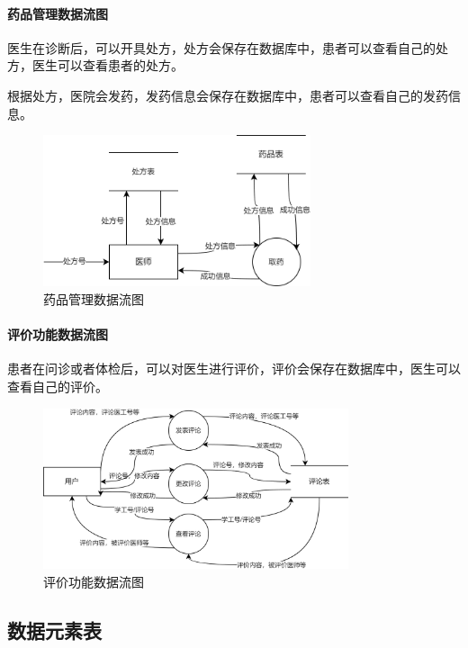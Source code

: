 \documentclass{article}
\begin{document}
\paragraph{药品管理数据流图}

医生在诊断后，可以开具处方，处方会保存在数据库中，患者可以查看自己的处方，医生可以查看患者的处方。

根据处方，医院会发药，发药信息会保存在数据库中，患者可以查看自己的发药信息。
\begin{figure}[H]
    \centering
    \includegraphics[width=0.7\textwidth]{images/drug_dataflow.png}
    \caption{药品管理数据流图}
\end{figure}

\paragraph{评价功能数据流图}

患者在问诊或者体检后，可以对医生进行评价，评价会保存在数据库中，医生可以查看自己的评价。

\begin{figure}[H]
    \centering
    \includegraphics[width=0.8\textwidth]{images/evaluation_dataflow.png}
    \caption{评价功能数据流图}
\end{figure}

\subsection{数据元素表}
\end{document}

